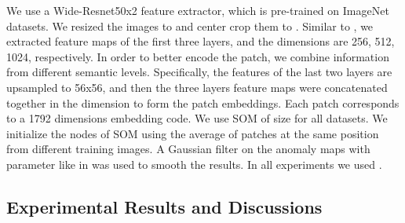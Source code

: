 \documentclass{article}
\begin{document}
We use a Wide-Resnet50x2 feature extractor, which is pre-trained on ImageNet datasets. We resized the images to  and center crop them to . 
Similar to \cite{SPADE}, we extracted feature maps of the first three layers, and the dimensions are 256, 512, 1024, respectively. 
In order to better encode the patch, we combine information from different semantic levels. Specifically, the features of the last two layers are upsampled to 56x56, and then the three layers feature maps were concatenated together in the dimension to form the patch embeddings. Each patch corresponds to a 1792 dimensions embedding code. We use SOM of size  for all datasets. We initialize the nodes of SOM using the average of patches at the same position from different training images.
A Gaussian filter on the anomaly maps with parameter  like in \cite{SPADE} was used to smooth the results. 
In all experiments we used . 

\subsection{Experimental Results and Discussions}
\end{document}
